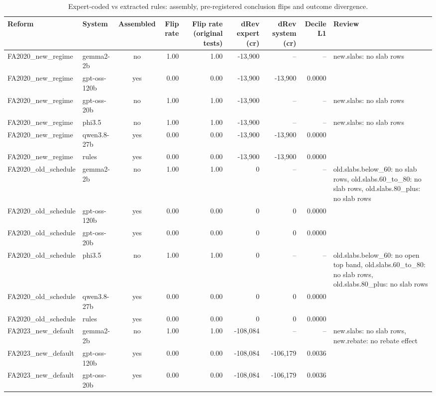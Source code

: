 \begin{table}[t]
\centering\small
\caption{Expert-coded vs extracted rules: assembly, pre-registered conclusion flips and outcome divergence.}
\label{tab:headline}
\begin{tabular}{llcrrrrrl}
\toprule
Reform & System & Assembled & Flip rate & Flip rate (original tests) & dRev expert (cr) & dRev system (cr) & Decile L1 & Review \\
\midrule
FA2020\_new\_regime & gemma2-2b & no & 1.00 & 1.00 & -13,900 & -- & -- & new.slabs: no slab rows \\
FA2020\_new\_regime & gpt-oss-120b & yes & 0.00 & 0.00 & -13,900 & -13,900 & 0.0000 &  \\
FA2020\_new\_regime & gpt-oss-20b & no & 1.00 & 1.00 & -13,900 & -- & -- & new.slabs: no slab rows \\
FA2020\_new\_regime & phi3.5 & no & 1.00 & 1.00 & -13,900 & -- & -- & new.slabs: no slab rows \\
FA2020\_new\_regime & qwen3.8-27b & yes & 0.00 & 0.00 & -13,900 & -13,900 & 0.0000 &  \\
FA2020\_new\_regime & rules & yes & 0.00 & 0.00 & -13,900 & -13,900 & 0.0000 &  \\
FA2020\_old\_schedule & gemma2-2b & no & 1.00 & 1.00 & 0 & -- & -- & old.slabs.below\_60: no slab rows, old.slabs.60\_to\_80: no slab rows, old.slabs.80\_plus: no slab rows \\
FA2020\_old\_schedule & gpt-oss-120b & yes & 0.00 & 0.00 & 0 & 0 & 0.0000 &  \\
FA2020\_old\_schedule & gpt-oss-20b & yes & 0.00 & 0.00 & 0 & 0 & 0.0000 &  \\
FA2020\_old\_schedule & phi3.5 & no & 1.00 & 1.00 & 0 & -- & -- & old.slabs.below\_60: no open top band, old.slabs.60\_to\_80: no slab rows, old.slabs.80\_plus: no slab rows \\
FA2020\_old\_schedule & qwen3.8-27b & yes & 0.00 & 0.00 & 0 & 0 & 0.0000 &  \\
FA2020\_old\_schedule & rules & yes & 0.00 & 0.00 & 0 & 0 & 0.0000 &  \\
FA2023\_new\_default & gemma2-2b & no & 1.00 & 1.00 & -108,084 & -- & -- & new.slabs: no slab rows, new.rebate: no rebate effect \\
FA2023\_new\_default & gpt-oss-120b & yes & 0.00 & 0.00 & -108,084 & -106,179 & 0.0036 &  \\
FA2023\_new\_default & gpt-oss-20b & yes & 0.00 & 0.00 & -108,084 & -106,179 & 0.0036 &  \\

\end{tabular}
\end{table}

